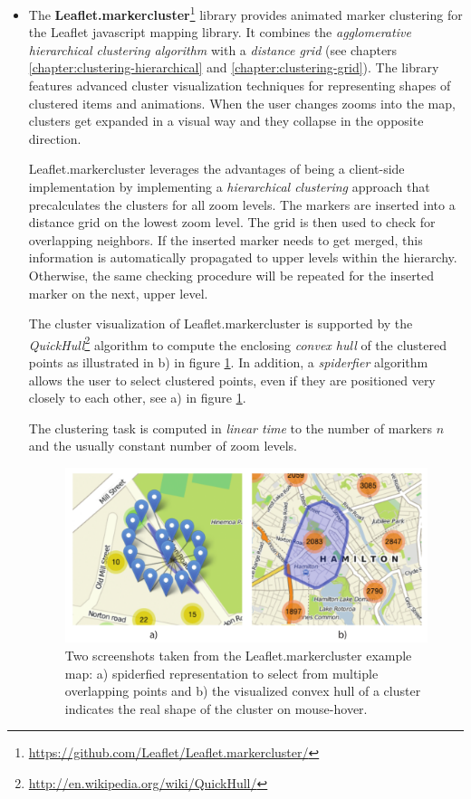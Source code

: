\begin{itemize}

\item The \textbf{Leaflet.markercluster}\footnote{\url{https://github.com/Leaflet/Leaflet.markercluster/}} library provides animated marker clustering for the Leaflet javascript mapping library. It combines the \textit{agglomerative hierarchical clustering algorithm} with a \textit{distance grid} (see chapters \ref{chapter:clustering-hierarchical} and \ref{chapter:clustering-grid}). The library features advanced cluster visualization techniques for representing shapes of clustered items and animations. When the user changes zooms into the map, clusters get expanded in a visual way and they collapse in the opposite direction.

Leaflet.markercluster leverages the advantages of being a client-side implementation by implementing a \textit{hierarchical clustering} approach that precalculates the clusters for all zoom levels. The markers are inserted into a distance grid on the lowest zoom level. The grid is then used to check for overlapping neighbors. If the inserted marker needs to get merged, this information is automatically propagated to upper levels within the hierarchy. Otherwise, the same checking procedure will be repeated for the inserted marker on the next, upper level.

The cluster visualization of Leaflet.markercluster is supported by the \textit{QuickHull}\footnote{\url{http://en.wikipedia.org/wiki/QuickHull/}} algorithm to compute the enclosing \textit{convex hull} of the clustered points as illustrated in b) in figure \ref{fig:leaflet}. In addition, a \textit{spiderfier} algorithm allows the user to select clustered points, even if they are positioned very closely to each other, see a) in figure \ref{fig:leaflet}.

The clustering task is computed in \textit{linear time} to the number of markers $n$ and the usually constant number of zoom levels. 

\begin{figure}[h]
  \begin{center}
    \includegraphics[width=1\textwidth]{figures/leaflet.pdf}
    \caption{Two screenshots taken from the Leaflet.markercluster example map: a) spiderfied representation to select from multiple overlapping points and b) the visualized convex hull of a cluster indicates the real shape of the cluster on mouse-hover.}
    \label{fig:leaflet}
  \end{center}
\end{figure}


\end{itemize}
